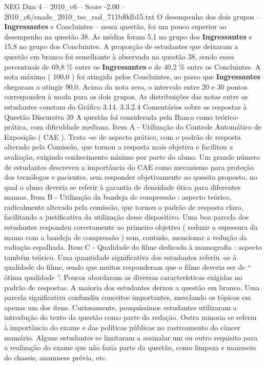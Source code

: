 \begin{textsample}{NEG Dim 4 – 2010\_c6 – Score -2.00 – 2010\_c6/enade\_2010\_tec\_rad\_711bf0db15.txt}
O desempenho dos dois grupos – \textbf{Ingressantes} e Concluintes – nessa questão, foi um pouco superior ao desempenho na questão 38.
As médias foram 5,1 no grupo dos \textbf{Ingressantes} e 15,8 no grupo dos Concluintes.
A proporção de estudantes que deixaram a questão em branco foi semelhante à observada na questão 38, sendo esses percentuais de 69,8 \% entre os \textbf{Ingressantes} e de 40,2 \% entre os Concluintes.
A nota máxima ( 100,0 ) foi atingida pelos Concluintes, ao passo que \textbf{Ingressantes} chegaram a atingir 90,0.
Acima da nota zero, o intervalo entre 20 e 30 pontos correspondeu à moda para os dois grupos.
As distribuições das notas entre os estudantes constam do Gráfico 3.14. 3.3.2.4 Comentários sobre as respostas à Questão Discursiva 39 A questão foi considerada pela Banca como teórico-prática, com dificuldade mediana.
Item A - Utilização do Controle Automático de Exposição ( CAE ).
Trata -se de aspecto prático, com o padrão de resposta alterado pela Comissão, que tornou a resposta mais objetiva e facilitou a avaliação, exigindo conhecimento mínimo por parte do aluno.
Um grande número de estudantes descreveu a importância do CAE como mecanismo para proteção dos tecnólogos e pacientes, sem responder objetivamente ao quesito proposto, no qual o aluno deveria se referir à garantia de densidade ótica para diferentes mamas.
Item B - Utilização da bandeja de compressão : aspecto teórico, radicalmente alterado pela comissão, que tornou o padrão de resposta claro, facilitando a justificativa da utilização desse dispositivo.
Uma boa parcela dos estudantes respondeu corretamente ao primeiro objetivo ( reduzir a espessura da mama com a bandeja de compressão ) sem, contudo, mencionar a redução da radiação espalhada.
Item C - Qualidade do filme dedicado à mamografia : aspecto também teórico.
Uma quantidade significativa dos estudantes referiu -se à qualidade do filme, sendo que muitos responderam que o filme deveria ser de “ ótima qualidade ”.
Poucos abordaram as diversas características exigidas no padrão de respostas.
A maioria dos estudantes deixou a questão em branco.
Uma parcela significativa confundiu conceitos importantes, mesclando os tópicos em apenas um dos itens.
Curiosamente, pouquíssimos estudantes utilizaram a introdução do texto da questão como parte da redação.
Outra minoria se referiu à importância do exame e das políticas públicas no rastreamento do câncer mamário.
Alguns estudantes se limitaram a assinalar um ou outro requisito para a realização do exame que não fazia parte da questão, como limpeza e manuseio do chassis, anamnese prévia, etc.

\end{textsample}
